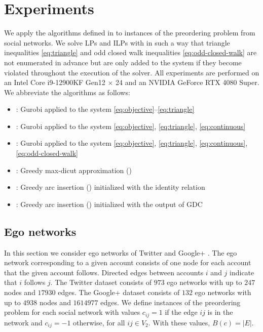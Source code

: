 \section{Experiments}
\label{sec:experiments}

We apply the algorithms defined in  to instances of the preordering problem from social networks.
We solve LPs and ILPs with \citet{gurobi} in such a way that triangle inequalities \eqref{eq:triangle} and odd closed walk inequalities \eqref{eq:odd-closed-walk} are not enumerated in advance but are only added to the system if they become violated throughout the execution of the solver.
All experiments are performed on an Intel Core i9-12900KF Gen12 $\times$ 24 and an NVIDIA GeForce RTX 4080 Super.
We abbreviate the algorithms as follows:
\begin{itemize}[nosep]
    \item {}: Gurobi applied to the system \eqref{eq:objective}--\eqref{eq:triangle}
    \item {}: Gurobi applied to the system \eqref{eq:objective}, \eqref{eq:triangle}, \eqref{eq:continuous}
    \item {}: Gurobi applied to the system \eqref{eq:objective}, \eqref{eq:triangle}, \eqref{eq:continuous}, \eqref{eq:odd-closed-walk}
    \item {}: Greedy max-dicut approximation ()
    \item {}: Greedy arc insertion () initialized with the identity relation
    \item {}: Greedy arc insertion () initialized with the output of GDC
\end{itemize}




\subsection{Ego networks}

In this section we consider ego networks of Twitter and Google+ \citep{leskovec2012learning}.
The ego network corresponding to a given account consists of one node for each account that the given account follows. 
Directed edges between accounts $i$ and $j$ indicate that $i$ follows $j$.
The Twitter dataset consists of $973$ ego networks with up to $247$ nodes and $17930$ edges.
The Google+ dataset consists of $132$ ego networks with up to $4938$ nodes and $1614977$ edges.
We define instances of the preordering problem for each social network with values $c_{ij} = 1$ if the edge $ij$ is in the network and $c_{ij} = -1$ otherwise, for all $ij \in V_2$.
With these values, $B(c) = |E|$.



